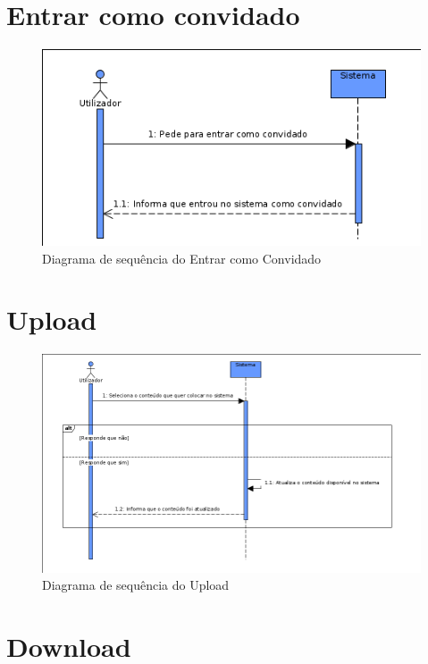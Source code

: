 \documentclass[a4paper]{report}
\begin{document}
\section{Entrar como convidado}

\begin{figure}[H]
	\centering 
    \includegraphics[width=\textwidth]{images/convidadoSeq.png}  
    \caption{Diagrama de sequência do Entrar como Convidado}
\end{figure}

\section{Upload}

\begin{figure}[H]
	\centering 
    \includegraphics[width=\textwidth]{images/uploadSeq.png}  
    \caption{Diagrama de sequência do Upload}
\end{figure}

\section{Download}
\end{document}
